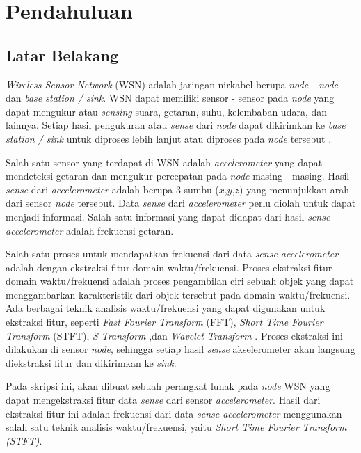 \chapter{Pendahuluan}
\label{chap:intro}
   
\section{Latar Belakang}
\label{sec:label}

{\it Wireless Sensor Network} (WSN) adalah jaringan nirkabel berupa {\it node - node} dan {\it base station / sink}. WSN dapat memiliki sensor - sensor pada {\it node} yang dapat mengukur atau {\it sensing} suara, getaran, suhu, kelembaban udara, dan lainnya. Setiap hasil pengukuran atau {\it sense} dari {\it node} dapat dikirimkan ke {\it base station / sink} untuk diproses lebih lanjut atau diproses pada {\it node} tersebut \cite{fundamentals:0:fundamental}. 

Salah satu sensor yang terdapat di WSN adalah {\it accelerometer} yang dapat mendeteksi getaran dan mengukur percepatan pada {\it node} masing - masing. Hasil {\it sense} dari {\it accelerometer} adalah berupa 3 sumbu ($x$,$y$,$z$) yang menunjukkan arah dari sensor {\it node} tersebut. Data {\it sense} dari {\it accelerometer} perlu diolah untuk dapat menjadi informasi. Salah satu informasi yang dapat didapat dari hasil {\it sense accelerometer} adalah frekuensi getaran.

Salah satu proses untuk mendapatkan frekuensi dari data {\it sense accelerometer} adalah dengan ekstraksi fitur domain waktu/frekuensi. Proses ekstraksi fitur domain waktu/frekuensi adalah proses pengambilan ciri sebuah objek yang dapat menggambarkan karakteristik dari objek tersebut pada domain waktu/frekuensi. Ada berbagai teknik analisis waktu/frekuensi yang dapat digunakan untuk ekstraksi fitur, seperti {\it Fast Fourier Transform} (FFT), {\it Short Time Fourier Transform} (STFT), {\it S-Transform} ,dan {\it Wavelet Transform} \cite{steven:0:dsp}. Proses ekstraksi ini dilakukan di sensor {\it node}, sehingga setiap hasil {\it sense} akselerometer akan langsung diekstraksi fitur dan dikirimkan ke {\it sink}. 

Pada skripsi ini, akan dibuat sebuah perangkat lunak pada {\it node} WSN yang dapat mengekstraksi fitur data {\it sense} dari sensor {\it accelerometer}. Hasil dari ekstraksi fitur ini adalah frekuensi dari data {\it sense accelerometer} menggunakan salah satu teknik analisis waktu/frekuensi, yaitu {\it Short Time Fourier Transform (STFT)}.

